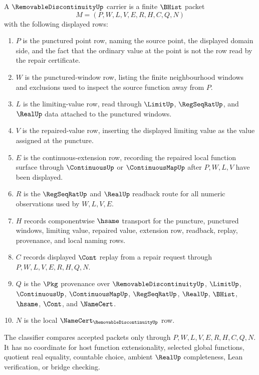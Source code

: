 \begin{definition}
\label{def:removable-discontinuity-carrier}
A $\RemovableDiscontinuityUp$ carrier is a finite $\BHist$ packet
$$
M=(P,W,L,V,E,R,H,C,Q,N)
$$
with the following displayed rows:
\begin{enumerate}
\item $P$ is the punctured point row, naming the source point, the displayed domain side, and the fact that the ordinary value at the point is not the row read by the repair certificate.
\item $W$ is the punctured-window row, listing the finite neighbourhood windows and exclusions used to inspect the source function away from $P$.
\item $L$ is the limiting-value row, read through $\LimitUp$, $\RegSeqRatUp$, and $\RealUp$ data attached to the punctured windows.
\item $V$ is the repaired-value row, inserting the displayed limiting value as the value assigned at the puncture.
\item $E$ is the continuous-extension row, recording the repaired local function surface through $\ContinuousUp$ or $\ContinuousMapUp$ after $P,W,L,V$ have been displayed.
\item $R$ is the $\RegSeqRatUp$ and $\RealUp$ readback route for all numeric observations used by $W,L,V,E$.
\item $H$ records componentwise $\hsame$ transport for the puncture, punctured windows, limiting value, repaired value, extension row, readback, replay, provenance, and local naming rows.
\item $C$ records displayed $\Cont$ replay from a repair request through $P,W,L,V,E,R,H,Q,N$.
\item $Q$ is the $\Pkg$ provenance over $\RemovableDiscontinuityUp$, $\LimitUp$, $\ContinuousUp$, $\ContinuousMapUp$, $\RegSeqRatUp$, $\RealUp$, $\BHist$, $\hsame$, $\Cont$, and $\NameCert$.
\item $N$ is the local $\NameCert_{\RemovableDiscontinuityUp}$ row.
\end{enumerate}
The classifier compares accepted packets only through $P,W,L,V,E,R,H,C,Q,N$. It has no coordinate for host function extensionality, selected global functions, quotient real equality, countable choice, ambient $\RealUp$ completeness, Lean verification, or bridge checking.
\end{definition}

